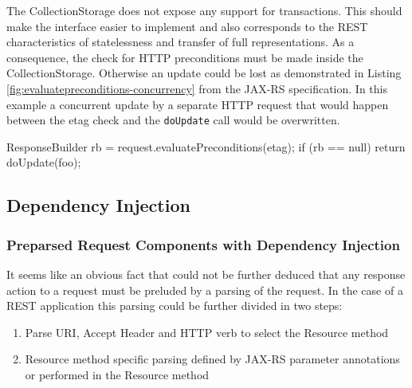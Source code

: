 \documentclass[11pt,a4paper,headsepline,twoside]{scrartcl}		%
\begin{document}
The CollectionStorage does not expose any support for transactions. This should
make the interface easier to implement and also corresponds to the REST
characteristics of statelessness and transfer of full representations. As a
consequence, the check for HTTP preconditions must be made inside the
CollectionStorage. Otherwise an update could be lost as demonstrated in Listing
\ref{fig:evaluatepreconditions-concurrency} from the JAX-RS
specification\cite[p. 28]{JAX-RS1.1}. In this example a concurrent update by a
separate HTTP request that would happen between the etag check and the
\lstinline:doUpdate: call would be overwritten.

\begin{javalisting}[label=fig:evaluatepreconditions-concurrency,
                   float=htb,
                   caption={Potential lost-update problem with JAX-RS}]
ResponseBuilder rb = request.evaluatePreconditions(etag);
if (rb == null) return doUpdate(foo);
\end{javalisting}



\subsection{Dependency Injection}
\label{sec:dependency-injection}

\subsubsection{Preparsed Request Components with Dependency Injection}
\label{sec:prep-requ-comp}

It seems like an obvious fact that could not be further deduced that any
response action to a request must be preluded by a parsing of the request. In
the case of a REST application this parsing could be further divided in two
steps:
\begin{enumerate}
\item Parse URI, Accept Header and HTTP verb to select the Resource method
\item Resource method specific parsing defined by JAX-RS parameter annotations
  or performed in the Resource method
\end{enumerate}
\end{document}
